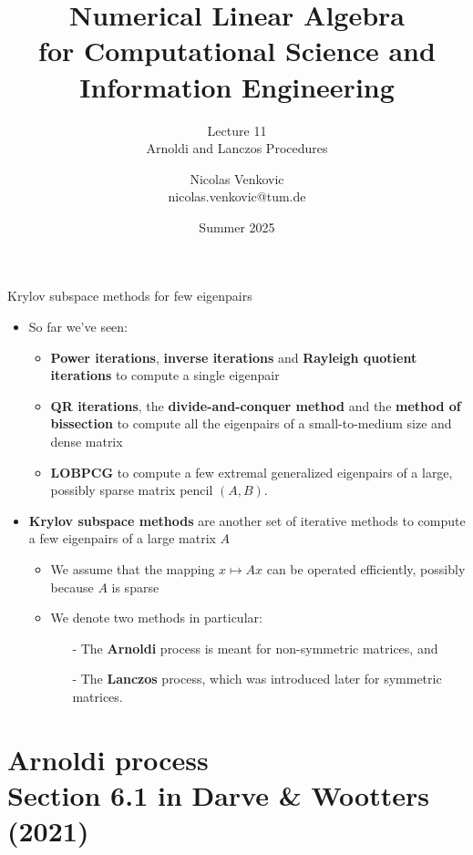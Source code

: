 \documentclass[t,usepdftitle=false]{beamer}
\title[NLA for CS and IE -- Lecture 11]{Numerical Linear Algebra\\for Computational Science and Information Engineering}
\subtitle{\vspace{.3cm}Lecture 11\\Arnoldi and Lanczos Procedures}
\date[Summer 2025]{Summer 2025}
\author[nicolas.venkovic@tum.de]{Nicolas Venkovic\\{\small nicolas.venkovic@tum.de}}
\institute[]{Group of Computational Mathematics\\School of Computation, Information and Technology\\Technical University of Munich}
\begin{document}
	
\begin{frame}
	\maketitle
\end{frame}
	
\myoutlineframe
	
\begin{frame}{Krylov subspace methods for few eigenpairs}
\begin{itemize}
\item So far we've seen:
\begin{itemize}\normalsize
\item \textbf{Power iterations}, \textbf{inverse iterations} and \textbf{Rayleigh quotient iterations} to compute a single eigenpair
\item \textbf{QR iterations}, the \textbf{divide-and-conquer method} and the \textbf{method of bissection} to compute all the eigenpairs of a small-to-medium size and dense matrix
\item \textbf{LOBPCG} to compute a few extremal generalized eigenpairs of a large, possibly sparse matrix pencil $(A,B)$.
\end{itemize}
\item \textbf{Krylov subspace methods} are another set of iterative methods to compute a few eigenpairs of a large matrix $A$
\begin{itemize}\normalsize
\item We assume that the mapping $x\mapsto Ax$ can be operated efficiently, possibly because $A$ is sparse\vspace{.1cm}
\item We denote two methods in particular:
\begin{itemize}\normalsize
\item[-] The \textbf{Arnoldi} process is meant for non-symmetric matrices, and\vspace{.1cm}
\item[-] The \textbf{Lanczos} process, which was introduced later for symmetric matrices.
\end{itemize}
\end{itemize}
\end{itemize}
\end{frame}
		
	
\section{Arnoldi process\\{\small Section 6.1 in Darve \& Wootters (2021)}}
\end{document}
